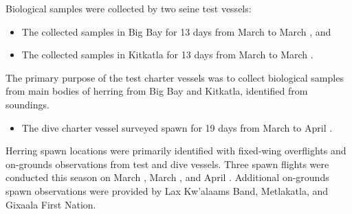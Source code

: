 Biological samples were collected by two seine test vessels:

\begin{itemize}

\item The  collected samples in Big Bay
for 13 days from March  to March , and 

\item The  collected samples in Kitkatla
for 13 days from March  to March .

\end{itemize}

The primary purpose of the test charter vessels was to
collect biological samples from main bodies of herring
from Big Bay and Kitkatla, identified from soundings.

\begin{itemize}

\item The dive charter vessel 
surveyed spawn for 19 days from March  to April .

\end{itemize}

Herring spawn locations were primarily identified with
fixed-wing overflights and on-grounds observations from test and dive vessels.
Three spawn flights were conducted this season
on March , March , and April .
Additional on-grounds spawn observations were provided by
Lax Kw'alaams Band, Metlakatla, and Gixaala First Nation.
